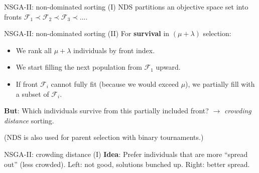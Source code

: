 \documentclass[11pt,compress,t,notes=noshow,xcolor=table]{beamer}
\begin{document}
\begin{framev}{NSGA-II: non-dominated sorting (I)}
NDS partitions an objective space set into fronts $\mathcal{F}_1 \prec \mathcal{F}_2 \prec \mathcal{F}_3 \prec ... $.\\
\spacer
{}
\end{framev}


\begin{framev}{NSGA-II: non-dominated sorting (II)}
For \textbf{survival} in $(\mu + \lambda)$ selection:
\begin{itemize}
\item We rank all $\mu + \lambda$ individuals by front index.
\item We start filling the next population from $\mathcal{F}_1$ upward.
\item If front $\mathcal{F}_i$ cannot fully fit (because we would exceed $\mu$), we partially fill with a subset of $\mathcal{F}_i$.
\end{itemize}
\textbf{But}: Which individuals survive from this partially included front?
$\to$ \emph{crowding distance} sorting.\\
\spacer
\begin{small}
(NDS is also used for parent selection with binary tournaments.)
\end{small}
\end{framev}


\begin{framev}{NSGA-II: crowding distance (I)}
\textbf{Idea}: Prefer individuals that are more ``spread out'' (less crowded).
\vfill
{}
Left: not good, solutions bunched up.
Right: better spread.
\end{framev}
\end{document}
